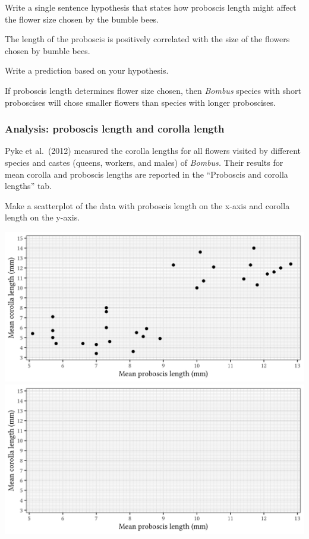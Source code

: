 \documentclass[12pt, hidelinks]{exam}
\newcommand*\AnswerBox[2]{%
    \parbox[t][#1]{0.92\textwidth}{%
    \begin{solution}#2\end{solution}}
    \vspace{\stretch{1}}
}
\begin{document}
\begin{questions}

\bigskip

\question
Write a single sentence hypothesis that states how proboscis length might affect the flower size chosen by the bumble bees.

\AnswerBox{2\baselineskip}{The length of the proboscis is positively correlated with the size	of the flowers chosen by bumble bees.}

\question
Write a prediction based on your hypothesis.

\AnswerBox{3\baselineskip}{If proboscis length determines flower size chosen, then \textit{Bombus} species with short proboscises will chose smaller flowers than species with longer proboscises.}


\subsubsection*{Analysis: proboscis length and corolla length}\label{sec:proboscis_flower_length}

Pyke et al.~(2012) measured the corolla lengths for all flowers visited by different species and castes (queens, workers, and males) of \textit{Bombus.} Their results for mean corolla and proboscis lengths are reported in the “Proboscis and corolla lengths” tab. 

\question
Make a scatterplot of the data with proboscis length on the x-axis and corolla length on the y-axis.

\ifprintanswers
	\includegraphics[width=\textwidth]{proboscis_corolla_key}
\else
	\includegraphics[width=\textwidth]{proboscis_corolla_blank}
\fi


\end{questions}
\end{document}
